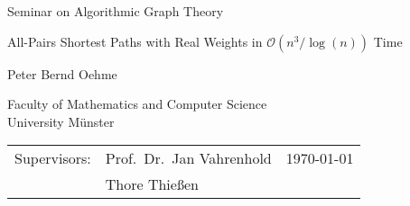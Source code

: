 

\usepackage[a4paper, margin=4cm, left=3cm, right=3cm]{geometry}



    \begin{titlepage}
        \setlength{\parindent}{0pt}

        \begin{center}
            \vspace*{12em}

            Seminar on Algorithmic Graph Theory

            \vspace*{3em}

            {\Huge{All-Pairs Shortest Paths with Real Weights in $\mathcal{O} \left( n^3 / \log(n) \right)$ Time}\par}

            \vspace*{\fill}

            {\Large{Peter Bernd Oehme}}

            \vspace*{3em}

            Faculty of Mathematics and Computer Science \\
            University Münster


        \end{center}

        \vspace*{8em}

        \begin{tabularx}{\textwidth}{l l >{\raggedleft\arraybackslash}X}
            Supervisors: & Prof.\ Dr.\ Jan Vahrenhold     & \today \\
                         & Thore Thießen & \\
        \end{tabularx}
    \end{titlepage}

